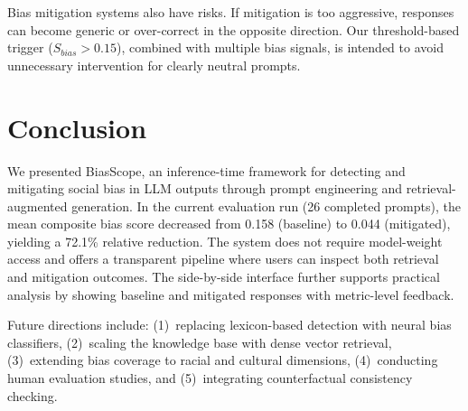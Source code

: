 \documentclass[conference]{IEEEtran}
\begin{document}
Bias mitigation systems also have risks. If mitigation is too aggressive, responses can become generic or over-correct in the opposite direction. Our threshold-based trigger ($S_{bias} > 0.15$), combined with multiple bias signals, is intended to avoid unnecessary intervention for clearly neutral prompts.

\section{Conclusion}

We presented BiasScope, an inference-time framework for detecting and mitigating social bias in LLM outputs through prompt engineering and retrieval-augmented generation. In the current evaluation run (26 completed prompts), the mean composite bias score decreased from 0.158 (baseline) to 0.044 (mitigated), yielding a 72.1\% relative reduction. The system does not require model-weight access and offers a transparent pipeline where users can inspect both retrieval and mitigation outcomes. The side-by-side interface further supports practical analysis by showing baseline and mitigated responses with metric-level feedback.

Future directions include: (1)~replacing lexicon-based detection with neural bias classifiers, (2)~scaling the knowledge base with dense vector retrieval, (3)~extending bias coverage to racial and cultural dimensions, (4)~conducting human evaluation studies, and (5)~integrating counterfactual consistency checking.
\end{document}
